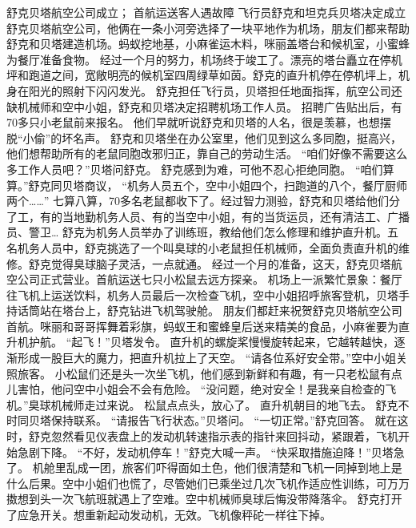 \documentclass[a4paper,12pt,UTF8,twoside]{ctexbook}
\begin{document}
        舒克贝塔航空公司成立； 
        首航运送客人遇故障   
        飞行员舒克和坦克兵贝塔决定成立舒克贝塔航空公司，他俩在一条小河旁选择了一块平地作为机场，朋友们都来帮助舒克和贝塔建造机场。蚂蚁挖地基，小麻雀运木料，咪丽盖塔台和候机室，小蜜蜂为餐厅准备食物。 
        经过一个月的努力，机场终于竣工了。漂亮的塔台矗立在停机坪和跑道之间，宽敞明亮的候机室四周绿草如茵。舒克的直升机停在停机坪上，机身在阳光的照射下闪闪发光。 
        舒克担任飞行员，贝塔担任地面指挥，航空公司还缺机械师和空中小姐，舒克和贝塔决定招聘机场工作人员。 
        招聘广告贴出后，有70多只小老鼠前来报名。 
        他们早就听说舒克和贝塔的人名，很是羡慕，也想摆脱“小偷”的坏名声。 
        舒克和贝塔坐在办公室里，他们见到这么多同胞，挺高兴，他们想帮助所有的老鼠同胞改邪归正，靠自己的劳动生活。 
        “咱们好像不需要这么多工作人员吧？”贝塔问舒克。 
        舒克感到为难，可他不忍心拒绝同胞。 
        “咱们算算。”舒克同贝塔商议，  “机务人员五个，空中小姐四个，扫跑道的八个，餐厅厨师两个……” 
        七算八算，70多名老鼠都收下了。经过智力测验，舒克和贝塔给他们分了工，有的当地勤机务人员、有的当空中小姐，有的当货运员，还有清洁工、广播员、警卫… 
        舒克为机务人员举办了训练班，教给他们怎么修理和维护直升机。五名机务人员中，舒克挑选了一个叫臭球的小老鼠担任机械师，全面负责直升机的维修。舒克觉得臭球脑子灵活，一点就通。 
        经过一个月的准备，这天，舒克贝塔航空公司正式营业。首航运送七只小松鼠去远方探亲。 
        机场上一派繁忙景象：餐厅往飞机上运送饮料，机务人员最后一次检查飞机，空中小姐招呼旅客登机，贝塔手持话筒站在塔台上，舒克钻进飞机驾驶舱。 
        朋友们都赶来祝贺舒克贝塔航空公司首航。咪丽和哥哥挥舞着彩旗，蚂蚁王和蜜蜂皇后送来精美的食品，小麻雀要为直升机护航。 
        “起飞！”贝塔发令。 
        直升机的螺旋桨慢慢旋转起来，它越转越快，逐渐形成一股巨大的魔力，把直升机拉上了天空。 
        “请各位系好安全带。”空中小姐关照旅客。 
        小松鼠们还是头一次坐飞机，他们感到新鲜和有趣，有一只老松鼠有点儿害怕，他问空中小姐会不会有危险。 
        “没问题，绝对安全！是我亲自检查的飞机。”臭球机械师走过来说。 
        松鼠点点头，放心了。 
        直升机朝目的地飞去。 
        舒克不时同贝塔保持联系。 
        “请报告飞行状态。”贝塔问。 
        “一切正常。”舒克回答。 
        就在这时，舒克忽然看见仪表盘上的发动机转速指示表的指针来回抖动，紧跟着，飞机开始急剧下降。 
        “不好，发动机停车！”舒克大喊一声。 
        “快采取措施迫降！”贝塔急了。 
        机舱里乱成一团，旅客们吓得面如土色，他们很清楚和飞机一同掉到地上是什么后果。空中小姐们也慌了，尽管她们已乘坐过几次飞机作适应性训练，可万万擞想到头一次飞航班就遇上了空难。空中机械师臭球后悔没带降落伞。 
        舒克打开了应急开关。想重新起动发动机，无效。飞机像秤砣一样往下掉。 
\end{document}
